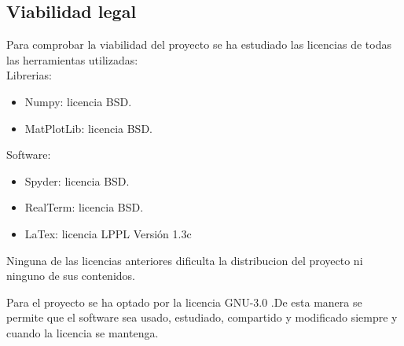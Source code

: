 \subsection{Viabilidad legal}

Para comprobar la viabilidad del proyecto se ha estudiado las licencias de todas las herramientas utilizadas:\\

Librerias:\\
\begin{itemize}
	\item Numpy: licencia BSD.
	\item MatPlotLib: licencia BSD.
\end{itemize}
Software:\\
\begin{itemize}
	\item Spyder: licencia BSD.
	\item RealTerm: licencia BSD.
	\item LaTex: licencia LPPL Versión 1.3c
\end{itemize}

Ninguna de las licencias anteriores dificulta la distribucion del proyecto ni ninguno de sus contenidos.

Para el proyecto se ha optado por la licencia GNU-3.0 \cite{wiki:gnu}.De esta manera se permite que el software sea usado, estudiado, compartido y modificado siempre y cuando la licencia se mantenga.





